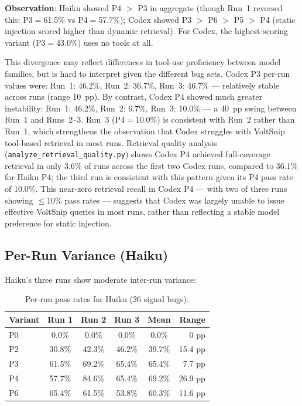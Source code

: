 \documentclass[10pt,a4paper,twocolumn]{article}
\begin{document}
\textbf{Observation}: Haiku showed P4 $>$ P3 in aggregate (though Run~1 reversed this: P3$=$61.5\% vs P4$=$57.7\%); Codex showed P3 $>$ P6 $>$ P5 $>$ P4 (static injection scored higher than dynamic retrieval).
For Codex, the highest-scoring variant (P3$=$43.0\%) uses no tools at all.

This divergence may reflect differences in tool-use proficiency between model families, but is hard to interpret given the different bug sets.
Codex P3 per-run values were: Run~1: 46.2\%, Run~2: 36.7\%, Run~3: 46.7\% --- relatively stable across runs (range 10~pp).
By contrast, Codex P4 showed much greater instability: Run~1: 46.2\%, Run~2: 6.7\%, Run~3: 10.0\% --- a 40~pp swing between Run~1 and Runs~2--3.
Run~3 (P4$=$10.0\%) is consistent with Run~2 rather than Run~1, which strengthens the observation that Codex struggles with VoltSnip tool-based retrieval in most runs.
Retrieval quality analysis (\texttt{analyze\_retrieval\_quality.py}) shows Codex P4 achieved full-coverage retrieval in only 3.6\% of runs across the first two Codex runs, compared to 36.1\% for Haiku P4; the third run is consistent with this pattern given its P4 pass rate of 10.0\%.
This near-zero retrieval recall in Codex P4 --- with two of three runs showing $\leq$10\% pass rates --- suggests that Codex was largely unable to issue effective VoltSnip queries in most runs, rather than reflecting a stable model preference for static injection.

\subsection{Per-Run Variance (Haiku)}
\label{sec:variance}

Haiku's three runs show moderate inter-run variance:

\begin{table}[t]
\centering
\caption{Per-run pass rates for Haiku (26 signal bugs).}
\label{tab:per-run}
\begin{tabular}{@{}lccccr@{}}
\toprule
\textbf{Variant} & \textbf{Run 1} & \textbf{Run 2} & \textbf{Run 3} & \textbf{Mean} & \textbf{Range} \\
\midrule
P0 & 0.0\%  & 0.0\%  & 0.0\%  & 0.0\%  & 0 pp    \\
P2 & 30.8\% & 42.3\% & 46.2\% & 39.7\% & 15.4 pp \\
P3 & 61.5\% & 69.2\% & 65.4\% & 65.4\% & 7.7 pp  \\
P4 & 57.7\% & 84.6\% & 65.4\% & 69.2\% & 26.9 pp \\
P6 & 65.4\% & 61.5\% & 53.8\% & 60.3\% & 11.6 pp \\
\bottomrule
\end{tabular}
\end{table}
\end{document}
